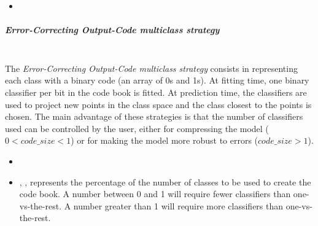 \begin{itemize}
  \item \estimatorDescription{}
\end{itemize}

\subparagraph{Error-Correcting Output-Code multiclass strategy}
\mbox{}
\\The \textit{Error-Correcting Output-Code multiclass strategy} consists in
representing each class with a binary code (an array of 0s and 1s).
%
At fitting time, one binary classifier per bit in the code book is fitted.
%
At prediction time, the classifiers are used to project new points in the class
space and the class closest to the points is chosen.
%
The main advantage of these strategies is that the number of classifiers used
can be controlled by the user, either for compressing the model ($0 < code\_
size < 1$) or for making the model more robust to errors ($code\_ size > 1$).

\begin{itemize}
  \item \estimatorDescription{}
  \item {}, , represents the
  percentage of the number of classes to be used to create the code book.
  A number between 0 and 1 will require fewer classifiers than one-vs-the-rest.
  A number greater than 1 will require more classifiers than one-vs-the-rest.
\end{itemize}


